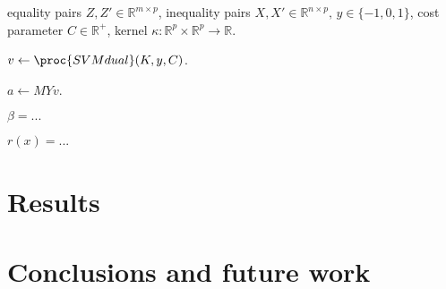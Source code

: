 \documentclass{article}
\newcommand{\RR}{\mathbb R}
\newcommand{\plausibleK}{\textit{plausibleK}}
\begin{document}
\begin{algorithm}[b!]
   \caption{}
   \label{alg:SVMcompare}
\begin{algorithmic}
   equality pairs $Z,Z'\in\RR^{m \times p}$,
  inequality pairs $X,X'\in\RR^{n\times p},\, y\in\{-1,0,1\}$, cost
  parameter $C\in\RR^+$, kernel $\kappa:\RR^p\times \RR^p \rightarrow
  \RR$.

  \STATE $v \gets \proc{SVMdual}(K, y, C)$.

  \STATE $a \gets M Y v$.

  \STATE $\beta = ...$
  
  \STATE $r(x) = ...$


  


  



   \end{algorithmic}
\end{algorithm}

\section{Results}
\label{sec:results}

\section{Conclusions and future work}
\label{sec:conclusions}



\end{document}
